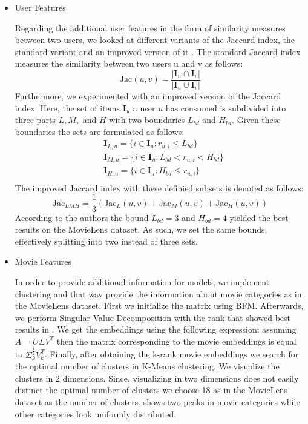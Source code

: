 \documentclass[10pt,conference,compsocconf]{IEEEtran}
\begin{document}
    \begin{itemize}

        \item User Features

        Regarding the additional user features in the form of similarity measures between two users, we looked at different variants of the Jaccard index, the standard variant and an improved version of it \cite{lee_improving_2017}.
        The standard Jaccard index measures the similarity between two users u and v as follows:
        $$\text{Jac}(u,v)=\frac{|\mathbf{I}_u \cap \mathbf{I}_v|}{|\mathbf{I}_u \cup \mathbf{I}_v|}$$
        Furthermore, we experimented with an improved version of the Jaccard index.
        Here, the set of items $\mathbf{I}_u$ a user $u$ has consumed is subdivided into three parts $L,M,$ and $H$ with two boundaries $L_{bd}$ and $H_{bd}$.
        Given these boundaries the sets are formulated as follows:
        \begin{align*}
            &\mathbf{I}_{L,u}=\{i \in \mathbf{I}_u : r_{u,i} \leq L_{bd}\}\\
            &\mathbf{I}_{M,u}=\{i \in \mathbf{I}_u : L_{bd} < r_{u,i} < H_{bd}\}\\
            &\mathbf{I}_{H,u}=\{i \in \mathbf{I}_u : H_{bd} \leq r_{u,i}\}\\
        \end{align*}
        The improved Jaccard index with these definied subsets is denoted as follows:
        $$\text{Jac}_{LMH}=\frac{1}{3}(\text{Jac}_L(u,v) + \text{Jac}_M(u,v) + \text{Jac}_H(u,v))$$
        According to the authors the bound $L_{bd} = 3$ and $H_{bd}=4$ yielded the best results on the MovieLens dataset.
        As such, we set the same bounds, effectively splitting into two instead of three sets.

        \item Movie Features

        In order to provide additional information for models, we implement clustering and that way provide the information
        about movie categories as in the MovieLens dataset. First we initialize the matrix using BFM.
        Afterwards, we perform Singular Value Decomposition with the rank that showed best results in .
        We get the embeddings using the following expression: assuming $A=U\Sigma V^T$ then the matrix corresponding to the movie embeddings is equal to $\Sigma _k ^{\frac{1}{2}} V_k ^T$.
        Finally, after obtaining the k-rank movie embeddings we search for the optimal number of clusters in K-Means clustering.
        We visualize the clusters in 2 dimensions. Since, visualizing in two dimensions does not easily distinct the optimal
        number of clusters we choose 18 as in the MovieLens dataset as the number of clusters. 
        shows two peaks in movie categories while other categories look uniformly distributed.
    \end{itemize}
\end{document}
